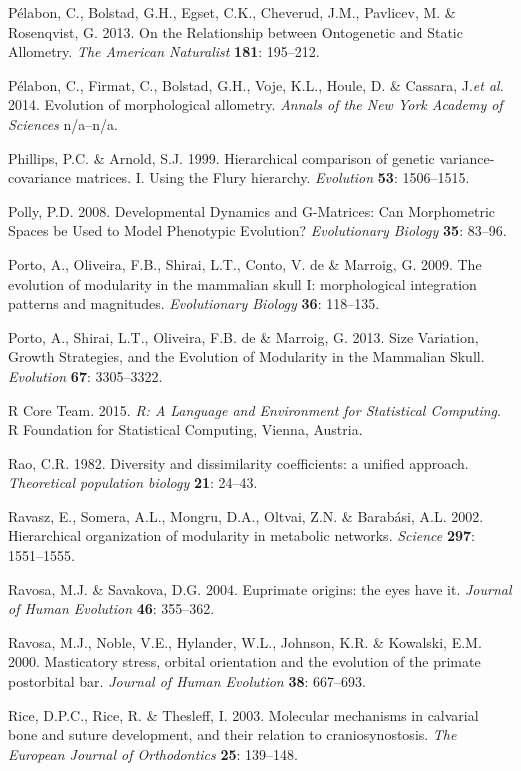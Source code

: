 \documentclass[12pt,twoside]{report}
\begin{document}
Pélabon, C., Bolstad, G.H., Egset, C.K., Cheverud, J.M., Pavlicev, M. \&
Rosenqvist, G. 2013. On the Relationship between Ontogenetic and Static
Allometry. \emph{The American Naturalist} \textbf{181}: 195--212.

Pélabon, C., Firmat, C., Bolstad, G.H., Voje, K.L., Houle, D. \&
Cassara, J.\emph{et al.} 2014. Evolution of morphological allometry.
\emph{Annals of the New York Academy of Sciences} n/a--n/a.

Phillips, P.C. \& Arnold, S.J. 1999. Hierarchical comparison of genetic
variance-covariance matrices. I. Using the Flury hierarchy.
\emph{Evolution} \textbf{53}: 1506--1515.

Polly, P.D. 2008. Developmental Dynamics and G-Matrices: Can
Morphometric Spaces be Used to Model Phenotypic Evolution?
\emph{Evolutionary Biology} \textbf{35}: 83--96.

Porto, A., Oliveira, F.B., Shirai, L.T., Conto, V. de \& Marroig, G.
2009. The evolution of modularity in the mammalian skull I:
morphological integration patterns and magnitudes. \emph{Evolutionary
Biology} \textbf{36}: 118--135.

Porto, A., Shirai, L.T., Oliveira, F.B. de \& Marroig, G. 2013. Size
Variation, Growth Strategies, and the Evolution of Modularity in the
Mammalian Skull. \emph{Evolution} \textbf{67}: 3305--3322.

R Core Team. 2015. \emph{R: A Language and Environment for Statistical
Computing}. R Foundation for Statistical Computing, Vienna, Austria.

Rao, C.R. 1982. Diversity and dissimilarity coefficients: a unified
approach. \emph{Theoretical population biology} \textbf{21}: 24--43.

Ravasz, E., Somera, A.L., Mongru, D.A., Oltvai, Z.N. \& Barabási, A.L.
2002. Hierarchical organization of modularity in metabolic networks.
\emph{Science} \textbf{297}: 1551--1555.

Ravosa, M.J. \& Savakova, D.G. 2004. Euprimate origins: the eyes have
it. \emph{Journal of Human Evolution} \textbf{46}: 355--362.

Ravosa, M.J., Noble, V.E., Hylander, W.L., Johnson, K.R. \& Kowalski,
E.M. 2000. Masticatory stress, orbital orientation and the evolution of
the primate postorbital bar. \emph{Journal of Human Evolution}
\textbf{38}: 667--693.

Rice, D.P.C., Rice, R. \& Thesleff, I. 2003. Molecular mechanisms in
calvarial bone and suture development, and their relation to
craniosynostosis. \emph{The European Journal of Orthodontics}
\textbf{25}: 139--148.
\end{document}
